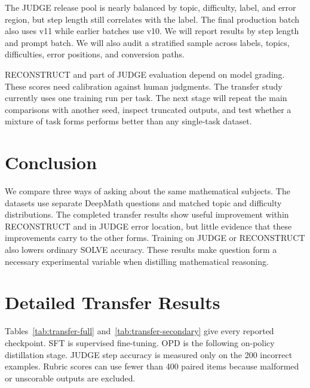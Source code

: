 \documentclass[11pt]{article}
\begin{document}
The JUDGE release pool is nearly balanced by topic, difficulty, label, and error region, but step length still correlates with the label. The final production batch also uses v11 while earlier batches use v10. We will report results by step length and prompt batch. We will also audit a stratified sample across labels, topics, difficulties, error positions, and conversion paths.

RECONSTRUCT and part of JUDGE evaluation depend on model grading. These scores need calibration against human judgments. The transfer study currently uses one training run per task. The next stage will repeat the main comparisons with another seed, inspect truncated outputs, and test whether a mixture of task forms performs better than any single-task dataset.

\section{Conclusion}

We compare three ways of asking about the same mathematical subjects. The datasets use separate DeepMath questions and matched topic and difficulty distributions. The completed transfer results show useful improvement within RECONSTRUCT and in JUDGE error location, but little evidence that these improvements carry to the other forms. Training on JUDGE or RECONSTRUCT also lowers ordinary SOLVE accuracy. These results make question form a necessary experimental variable when distilling mathematical reasoning.



\clearpage
\appendix

\section{Detailed Transfer Results}
\label{app:transfer}

Tables~\ref{tab:transfer-full} and~\ref{tab:transfer-secondary} give every reported checkpoint. SFT is supervised fine-tuning. OPD is the following on-policy distillation stage. JUDGE step accuracy is measured only on the 200 incorrect examples. Rubric scores can use fewer than 400 paired items because malformed or unscorable outputs are excluded.
\end{document}
